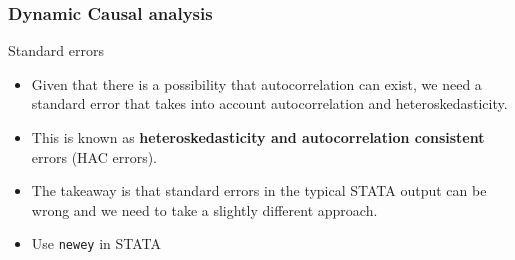 \documentclass[compress]{beamer}
\begin{document}
\begin{frame}
\frametitle{Dynamic Causal analysis}
Standard errors
\begin{itemize}
\item Given that there is a possibility that autocorrelation can exist, we need a standard error that takes into account autocorrelation and heteroskedasticity. 
\item This is known as \textbf{heteroskedasticity and autocorrelation consistent} errors (HAC errors). 
\item The takeaway is that standard errors in the typical STATA output can be wrong and we need to take a slightly different approach.
\item Use \texttt{newey} in STATA 
\end{itemize}
\end{frame}
\end{document}
